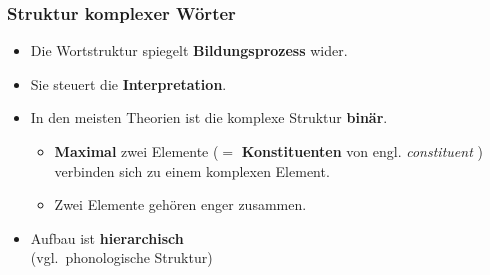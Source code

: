 \begin{frame}
\frametitle{Struktur komplexer Wörter}

\begin{minipage}{.65\textwidth}

	\begin{itemize}
		\item Die Wortstruktur spiegelt \textbf{Bildungsprozess} wider.
		\item Sie steuert die \textbf{Interpretation}.
		\item In den meisten Theorien ist die komplexe Struktur \textbf{binär}.
		
		\begin{itemize}
			\item \textbf{Maximal} zwei Elemente ($=$ \textbf{Konstituenten} von engl. \emph{constituent} ) verbinden sich zu einem komplexen Element.
			\item Zwei Elemente gehören enger zusammen.
		\end{itemize}
		\item Aufbau ist \textbf{hierarchisch} \\
		(vgl.\ phonologische Struktur)
	\end{itemize}

\end{minipage}
%
\hfill%
%
\begin{minipage}{.34\textwidth}
\begin{figure}	
\centering
\scalebox{0.7}{
\begin{forest} 
	[Haustürschlüssel
		[Haustür
			[Haus] 
			[Tür]]
		[Schlüssel]]									
\end{forest}}

\vspace{.75cm}

\scalebox{.7}{
\begin{forest}
	[Zugverbindung
		[Zug]
		[Verbindung
			[verbind
				[ver-]
				[bind]]
			[-ung]]]
\end{forest}}
\end{figure}
\end{minipage}

\end{frame}


